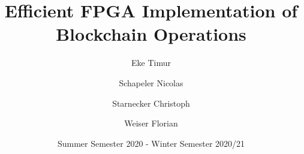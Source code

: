 \documentclass[course=eragp]{aspdoc}
\author{ Eke Timur \and Schapeler Nicolas \and Starnecker Christoph \and Weiser Florian}
\date{Summer Semester 2020 - Winter Semester 2020/21}
\title{Efficient FPGA Implementation of Blockchain Operations}
\begin{document}
\maketitle

\tableofcontents

\newpage

\newcommand{\maxHashrateNum}{50.0}
\newcommand{\maxHashrate}{\maxHashrateNum~\textit{MHash/s}}















\newpage



\newpage
\listoftables

\newpage
\listoffigures
\end{document}
